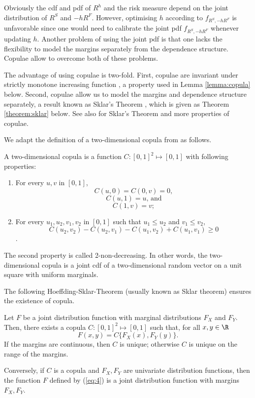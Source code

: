 Obviously the cdf and pdf of $R^h$ and the risk measure depend on the
joint distribution of $R^S$ and $-hR^F$. However, optimising $h$
according to $f_{R^S,-hR^F}$ is unfavorable since one would need to
calibrate the joint pdf $f_{R^S,-hR^F}$ whenever updating $h$.
Another problem of using the joint pdf is that one lacks the
flexibility to model the margins separately from the dependence
structure. Copulae allow to overcome both of these problems. 

The advantage of using copulae is two-fold.
First, copulae are invariant under strictly
monotone increasing function \citep{schweizer1981nonparametric}, a
property used in Lemma \ref{lemma:copula} below. 
Second, copulae allow us to model the margins and dependence structure 
separately, a result known as Sklar's Theorem \citep{Sklar1959}, which
is given as Theorem \ref{theorem:sklar} below. 
See also \citep{Nelsen1999, joe1997multivariate, McNeil2005} for
Sklar's Theorem and more properties of copulae.

We adapt the definition of a two-dimensional copula from \citep{Nelsen1999} as follows.

\begin{defi} 
  A two-dimensional copula is a function $C: [0,1]^2 \mapsto [0,1]$ with following properties:
  \begin{enumerate}
    \item For every $u,v$ in $[0,1]$,
      \[C(u,0)= C(0,v)=0, \]
    \[C(u,1)= u \text{, and}\]
    \[C(1,v)= v;\]
    \item For every $u_1,u_2, v_1, v_2$ in $[0,1]$ such that $u_1 \leq u_2$ and $v_1 \leq v_2$,
    \[C(u_2,v_2)-C(u_2,v_1)-C(u_1, v_2)+C(u_1,v_1) \geq 0\].
    \end{enumerate}
  \end{defi}

The second property is called 2-non-decreasing.
In other words, the two-dimensional copula is a joint cdf of a two-dimensional random vector
on a unit square with uniform marginals.

The following Hoeffding-Sklar-Theorem (usually known as Sklar theorem) ensures the existence of copula.

\begin{theorem}
  \label{theorem:sklar}
  Let $F$ be a joint distribution function with marginal distributions
  $F_X$ and $F_Y$. Then, there exists a copula $C:[0,1]^2 \mapsto
  [0,1]$ such that, for all $x,y\in \R$
  \begin{equation}
    \label{eq:4}
    F(x,y)=C\{F_X(x), F_Y(y)\}.
  \end{equation}
  If the margins are continuous, then $C$ is unique; otherwise $C$ is
  unique on the range of the margins.

  Conversely, if $C$ is a copula and $F_X, F_Y$ are univariate
  distribution functions, then the function $F$ defined by (\ref{eq:4})
  is a joint distribution function with margins $F_X, F_Y$.
\end{theorem}

